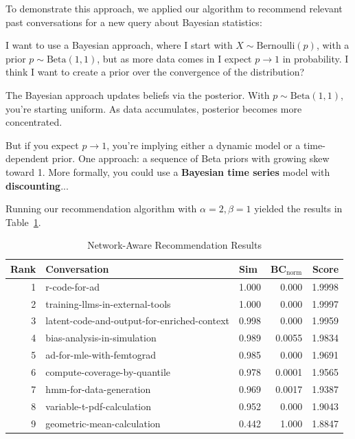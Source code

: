 \documentclass[10pt, a4paper]{article}
\begin{document}
To demonstrate this approach, we applied our algorithm to recommend relevant past conversations for a new query about Bayesian statistics:

\begin{tcolorbox}[title=User Prompt]
I want to use a Bayesian approach, where I start with \( X \sim \text{Bernoulli}(p) \), with a prior \( p \sim \text{Beta}(1,1) \), but as more data comes in I expect \( p \to 1 \) in probability. I think I want to create a prior over the convergence of the distribution?
\end{tcolorbox}

\begin{tcolorbox}[title=ChatGPT Response (Excerpt)]
The Bayesian approach updates beliefs via the posterior. With \( p \sim \text{Beta}(1,1) \), you're starting uniform. As data accumulates, posterior becomes more concentrated.

But if you expect \( p \to 1 \), you're implying either a dynamic model or a time-dependent prior. One approach: a sequence of Beta priors with growing skew toward 1. More formally, you could use a \textbf{Bayesian time series} model with \textbf{discounting}...
\end{tcolorbox}

Running our recommendation algorithm with \(\alpha=2, \beta=1\) yielded the results in Table~\ref{tab:recommendations}.

\begin{table}
\centering
\caption{Network-Aware Recommendation Results}
\label{tab:recommendations}
\begin{tabular}{rllrr}
\toprule
Rank & Conversation & Sim & BC$_\text{norm}$ & Score \\
\midrule
1 & r-code-for-ad & 1.000 & 0.000 & 1.9998 \\
2 & training-llms-in-external-tools & 1.000 & 0.000 & 1.9997 \\
3 & latent-code-and-output-for-enriched-context & 0.998 & 0.000 & 1.9959 \\
4 & bias-analysis-in-simulation & 0.989 & 0.0055 & 1.9834 \\
5 & ad-for-mle-with-femtograd & 0.985 & 0.000 & 1.9691 \\
6 & compute-coverage-by-quantile & 0.978 & 0.0001 & 1.9565 \\
7 & hmm-for-data-generation & 0.969 & 0.0017 & 1.9387 \\
8 & variable-t-pdf-calculation & 0.952 & 0.000 & 1.9043 \\
9 & geometric-mean-calculation & 0.442 & 1.000 & 1.8847 \\
\bottomrule
\end{tabular}
\end{table}
\end{document}
